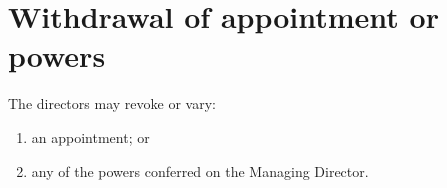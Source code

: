 \section{Withdrawal of appointment or powers}

The directors may revoke or vary:

\begin{enumerate}[label=(\alph*)]
    \item an appointment; or
    \item any of the powers conferred on the Managing Director.
\end{enumerate} 